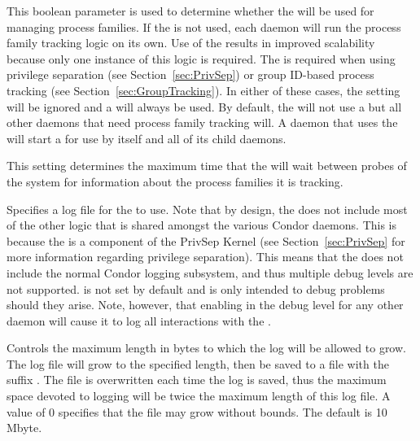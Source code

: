 \begin{description}

\label{param:UseProcd}
\item[\Macro{USE\_PROCD}]
  This boolean parameter
  is used to determine whether the  will be used for
  managing process families. If the  is not used, each
  daemon will run the process family tracking logic on its own. Use of
  the  results in improved scalability because only one
  instance of this logic is required. The  is required
  when using privilege separation (see Section~\ref{sec:PrivSep}) or
  group ID-based process tracking (see
  Section~\ref{sec:GroupTracking}). In either of these cases, the
   setting will be ignored and a  will
  always be used. By default, the  will not use a
   but all other daemons that need process family tracking will.
  A daemon that uses the  will start a  for
  use by itself and all of its child daemons.

\label{param:ProcdMaxSnapshotInterval}
\item[\Macro{PROCD\_MAX\_SNAPSHOT\_INTERVAL}]
  This setting determines the maximum time that the  will
  wait between probes of the system for information about the process
  families it is tracking.

\label{param:ProcdLog}
\item[\Macro{PROCD\_LOG}]
  Specifies a log file for the  to use.
  Note that by design, the  does not
  include most of the other logic that is shared amongst the various
  Condor daemons. This is because the  is a component of
  the PrivSep Kernel (see Section~\ref{sec:PrivSep} for more information
  regarding privilege separation). This means that the 
  does not include the normal Condor logging subsystem, and thus 
  multiple debug levels are not supported.
   is not set by default and
  is only intended to debug problems should they arise. Note, however,
  that enabling  in the debug level for any other
  daemon will cause it to log all interactions with the .


\label{param:MaxProcdLog}
\item[\Macro{MAX\_PROCD\_LOG}]
  Controls the maximum length in bytes to which the 
  log will be allowed to grow.  The log file will grow to the
  specified length, then be saved to a file with the suffix
  .  The 
  file is overwritten each time the log is saved, thus the maximum
  space devoted to logging will be twice the
  maximum length of this log file.  A value of 0 specifies that the
  file may grow without bounds.  The default is 10 Mbyte.


\end{description}
